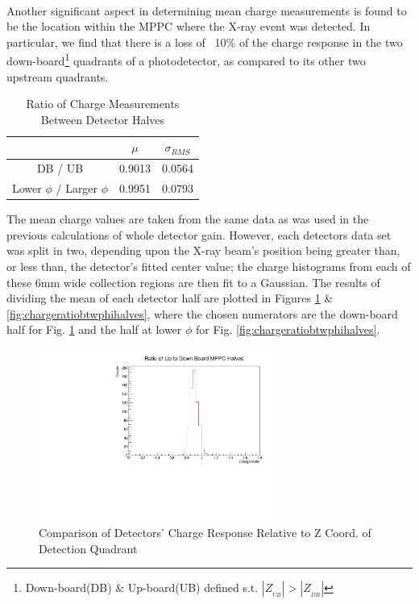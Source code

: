  \\
Another significant aspect in determining mean charge measurements is found to be the location within the MPPC where the X-ray event was detected. In particular, we find that there is a loss of ~10\% of the charge response in the two down-board\footnote{Down-board(DB) \& Up-board(UB) defined s.t. $|Z_{_{UB}}|>|Z_{_{DB}}|$} quadrants of a photodetector, as compared to its other two upstream quadrants.
\begin{table}[H]
    \centering
    \begin{tabular}{c||c|c}
        & $\mu$ & $\sigma_{RMS}$ \\
        \hline
        DB / UB & 0.9013 & 0.0564 \\
        Lower $\phi$ / Larger $\phi$ &  0.9951 & 0.0793
    \end{tabular}
    \caption{Ratio of Charge Measurements Between Detector Halves}
    \label{tab:halfqratiovalues}
\end{table}
The mean charge values are taken from the same data as was used in the previous calculations of whole detector gain. However, each detectors data set was split in two, depending upon the X-ray beam's position being greater than, or less than, the detector's fitted center value; the charge histograms from each of these 6mm wide collection regions are then fit to a Gaussian.
The results of dividing the mean of each detector half are plotted in Figures \ref{fig:chargeratiobtwzhalves} \& \ref{fig:chargeratiobtwphihalves}, where the chosen numerators are the down-board half for Fig. \ref{fig:chargeratiobtwzhalves} and the half at lower $\phi$ for Fig. \ref{fig:chargeratiobtwphihalves}.
\begin{figure}[H]
    \centering
    \includegraphics[width=8cm]{graphics/halfmppcqrationostats.pdf}
    \caption{Comparison of Detectors' Charge Response Relative to Z Coord. of Detection Quadrant}
    \label{fig:chargeratiobtwzhalves}
\end{figure}
